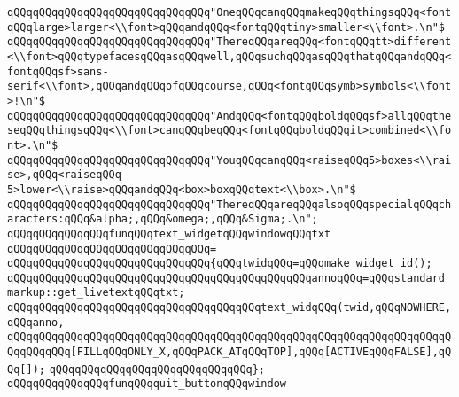 \verb|qQQqqQQqqQQqqQQqqQQqqQQqqQQqqQQq"OneqQQqcanqQQqmakeqQQqthingsqQQq<fontqQQqlarge>larger<\\font>qQQqandqQQq<fontqQQqtiny>smaller<\\font>.\n"$|\newline
\verb|qQQqqQQqqQQqqQQqqQQqqQQqqQQqqQQq"ThereqQQqareqQQq<fontqQQqtt>different<\\font>qQQqtypefacesqQQqasqQQqwell,qQQqsuchqQQqasqQQqthatqQQqandqQQq<fontqQQqsf>sans-serif<\\font>,qQQqandqQQqofqQQqcourse,qQQq<fontqQQqsymb>symbols<\\font>!\n"$|\newline
\verb|qQQqqQQqqQQqqQQqqQQqqQQqqQQqqQQq"AndqQQq<fontqQQqboldqQQqsf>allqQQqtheseqQQqthingsqQQq<\\font>canqQQqbeqQQq<fontqQQqboldqQQqit>combined<\\font>.\n"$|\newline
\verb|qQQqqQQqqQQqqQQqqQQqqQQqqQQqqQQq"YouqQQqcanqQQq<raiseqQQq5>boxes<\\raise>,qQQq<raiseqQQq-5>lower<\\raise>qQQqandqQQq<box>boxqQQqtext<\\box>.\n"$|\newline
\verb|qQQqqQQqqQQqqQQqqQQqqQQqqQQqqQQq"ThereqQQqareqQQqalsoqQQqspecialqQQqcharacters:qQQq&alpha;,qQQq&omega;,qQQq&Sigma;.\n";|\newline
\newline
\verb|qQQqqQQqqQQqqQQqfunqQQqtext_widgetqQQqwindowqQQqtxt|\newline
\verb|qQQqqQQqqQQqqQQqqQQqqQQqqQQqqQQq=|\newline
\verb|qQQqqQQqqQQqqQQqqQQqqQQqqQQqqQQq{qQQqtwidqQQq=qQQqmake_widget_id();|\newline
\verb|qQQqqQQqqQQqqQQqqQQqqQQqqQQqqQQqqQQqqQQqqQQqqQQqannoqQQq=qQQqstandard_markup::get_livetextqQQqtxt;|\newline
\verb|qQQqqQQqqQQqqQQqqQQqqQQqqQQqqQQqqQQqqQQqtext_widqQQq(twid,qQQqNOWHERE,qQQqanno,|\newline
\verb|qQQqqQQqqQQqqQQqqQQqqQQqqQQqqQQqqQQqqQQqqQQqqQQqqQQqqQQqqQQqqQQqqQQqqQQqqQQqqQQq[FILLqQQqONLY_X,qQQqPACK_ATqQQqTOP],qQQq[ACTIVEqQQqFALSE],qQQq[]);|\newline
\verb|qQQqqQQqqQQqqQQqqQQqqQQqqQQqqQQq};|\newline
\newline
\newline
\verb|qQQqqQQqqQQqqQQqfunqQQqquit_buttonqQQqwindow|\newline
